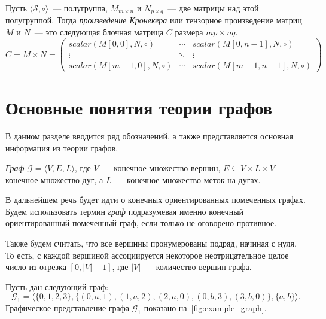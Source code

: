 \begin{definition}

\label{def:kron}
Пусть $\langle \mathcal{S}, \circ \rangle$~--- полугруппа, $M_{m \times n}$ и $N_{p \times q}$~--- две матрицы над этой полугруппой.
Тогда \textit{произведение Кронекера} или тензорное произведение матриц $M$ и $N$~--- это следующая блочная матрица $C$ размера $mp \times nq$.
$$
C = M \times N =
\begin{pmatrix}
scalar(M[0, 0], N, \circ)   & \cdots & scalar(M[0, n - 1], N, \circ)   \\
\vdots                   & \ddots & \vdots       \\
scalar(M[m - 1, 0], N, \circ) & \cdots & scalar(M[m - 1, n - 1], N, \circ)
\end{pmatrix}
$$

\end{definition}


\section{Основные понятия теории графов}\label{sec:ch1/sec2}
В данном разделе вводится ряд обозначений, а также представляется основная информация из теории графов.

\begin{definition}[Граф]  
	\textit{Граф} $\mathcal{G} = \langle V, E, L \rangle$, где $V$~--- конечное множество вершин, $E \subseteq V \times L \times V$~--- конечное множество дуг, а $L$~--- конечное множество меток на дугах.
\end{definition}

В дальнейшем речь будет идти о конечных ориентированных помеченных графах.
Будем использовать термин \textit{граф} подразумевая именно конечный ориентированный помеченный граф, если только не оговорено противное.

Также будем считать, что все вершины пронумерованы подряд, начиная с нуля. То есть, с каждой вершиной ассоциируется некоторое неотрицательное целое число из отрезка $[0, |V| - 1]$, где $|V|$~--- количество вершин графа.

\begin{example}
	Пусть дан следующий граф: $$\mathcal{G}_1 = \langle \{0, 1, 2, 3\}, \{(0, a, 1), (1, a, 2), (2, a, 0), (0, b, 3), (3, b, 0)\}, \{a, b\} \rangle.$$
	Графическое представление графа $\mathcal{G}_1$ показано на~\cref{fig:example_graph}.
\end{example}

